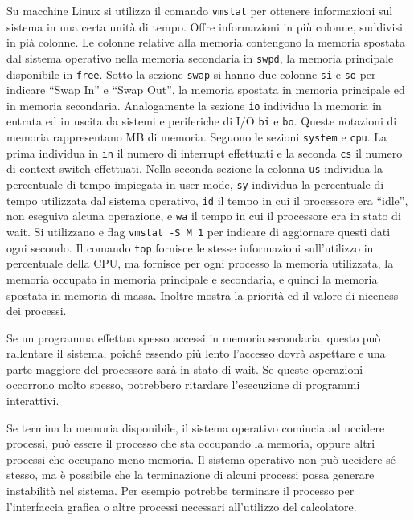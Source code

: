 \documentclass{article}
\numberwithin{equation}{subsection}
\begin{document}
Su macchine Linux si utilizza il comando \verb|vmstat| per ottenere informazioni sul sistema in una certa unità di tempo. Offre informazioni in più 
colonne, suddivisi in pià colonne. Le colonne relative alla memoria contengono la memoria spostata dal sistema operativo nella memoria secondaria in \verb|swpd|, la memoria principale 
disponibile in \verb|free|. Sotto la sezione \verb|swap| si hanno due colonne \verb|si| e \verb|so| per indicare ``Swap In'' e ``Swap Out'', la memoria spostata in memoria 
principale ed in memoria secondaria. Analogamente la sezione \verb|io| individua la memoria in entrata ed in uscita da sistemi e periferiche di I/O \verb|bi| e \verb|bo|. 
Queste notazioni di memoria rappresentano MB di memoria. Seguono le sezioni \verb|system| e \verb|cpu|. La prima individua in \verb|in| il numero di interrupt 
effettuati e la seconda \verb|cs| il numero di context switch effettuati. Nella seconda sezione la colonna \verb|us| individua la percentuale di tempo impiegata 
in user mode, \verb|sy| individua la percentuale di tempo utilizzata dal sistema operativo, \verb|id| il tempo in cui il processore era ``idle'', non eseguiva alcuna 
operazione, e \verb|wa| il tempo in cui il processore era in stato di wait. 
Si utilizzano e flag \verb|vmstat -S M 1| per indicare di aggiornare questi dati ogni secondo. Il comando \verb|top| fornisce le stesse informazioni sull'utilizzo in 
percentuale della CPU, ma fornisce per ogni processo la memoria utilizzata, la memoria occupata in memoria principale e secondaria, e quindi la memoria spostata 
in memoria di massa. Inoltre mostra la priorità ed il valore di niceness dei processi. 


Se un programma effettua spesso accessi in memoria secondaria, questo può rallentare il sistema, poiché essendo più lento l'accesso dovrà aspettare e una parte maggiore 
del processore sarà in stato di wait. Se queste operazioni occorrono molto spesso, potrebbero ritardare l'esecuzione di programmi interattivi. 

Se termina la memoria disponibile, il sistema operativo comincia ad uccidere processi, può essere il processo che sta occupando la memoria, oppure 
altri processi che occupano meno memoria. Il sistema operativo non può uccidere sé stesso, ma è possibile che la terminazione di alcuni processi 
possa generare instabilità nel sistema. Per esempio potrebbe terminare il processo per l'interfaccia grafica o altre processi necessari all'utilizzo del calcolatore. 

\clearpage
\end{document}
